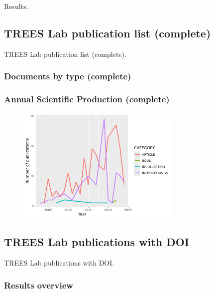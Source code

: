 \documentclass[aspectratio=169]{beamer}
\begin{document}
\begin{frame}
    Results.
\end{frame}



\subsection{TREES Lab publication list (complete)}



\begin{frame}
    TREES Lab publication list (complete).
\end{frame}

\begin{frame}
    \frametitle{Documents by type (complete)}
	\centering
	\small
	
\end{frame}

\begin{frame}
    \frametitle{Annual Scientific Production (complete)}
    \begin{figure}
        \centering
		\includegraphics[width=0.7\textwidth]{figures/AnnualScientProd_total.png}
    \end{figure}
\end{frame}


\subsection{TREES Lab publications with DOI}


\begin{frame}
    TREES Lab publications with DOI.
\end{frame}


\subsubsection{Results overview}
\end{document}
